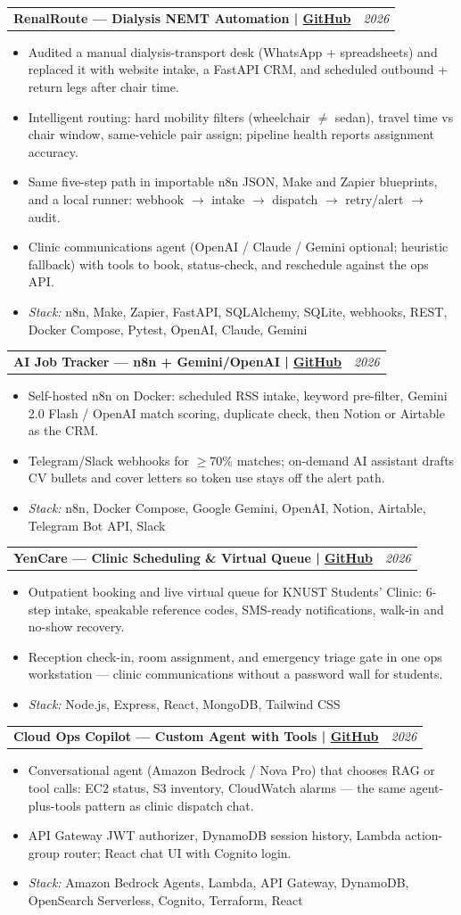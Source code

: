 \documentclass[letterpaper,11pt]{article}
\makeatletter
\newcommand{\resumeItem}[1]{\item\small{#1\vspace{-1pt}}}
\newcommand{\resumeProjectHeading}[2]{%
  \vspace{-2pt}\item
  \begin{tabular*}{1.0\textwidth}[t]{l@{\extracolsep{\fill}}r}
    \textbf{#1} & \textit{\small #2} \\
  \end{tabular*}\vspace{-7pt}
}
\newcommand{\resumeItemListStart}{\begin{itemize}[leftmargin=0.15in]}
\newcommand{\resumeItemListEnd}{\end{itemize}\vspace{-5pt}}
\makeatother
\begin{document}
  \resumeProjectHeading
    {RenalRoute --- Dialysis NEMT Automation \textnormal{|} \href{https://github.com/GeekKwame/renal-route}{\small GitHub}}{2026}
  \resumeItemListStart
    \resumeItem{Audited a manual dialysis-transport desk (WhatsApp + spreadsheets) and replaced it with website intake, a FastAPI CRM, and scheduled outbound + return legs after chair time.}
    \resumeItem{Intelligent routing: hard mobility filters (wheelchair $\neq$ sedan), travel time vs chair window, same-vehicle pair assign; pipeline health reports assignment accuracy.}
    \resumeItem{Same five-step path in importable n8n JSON, Make and Zapier blueprints, and a local runner: webhook $\rightarrow$ intake $\rightarrow$ dispatch $\rightarrow$ retry/alert $\rightarrow$ audit.}
    \resumeItem{Clinic communications agent (OpenAI / Claude / Gemini optional; heuristic fallback) with tools to book, status-check, and reschedule against the ops API.}
    \resumeItem{\textit{Stack:} n8n, Make, Zapier, FastAPI, SQLAlchemy, SQLite, webhooks, REST, Docker Compose, Pytest, OpenAI, Claude, Gemini}
  \resumeItemListEnd

  \resumeProjectHeading
    {AI Job Tracker --- n8n + Gemini/OpenAI \textnormal{|} \href{https://github.com/GeekKwame/job-tracker-n8n}{\small GitHub}}{2026}
  \resumeItemListStart
    \resumeItem{Self-hosted n8n on Docker: scheduled RSS intake, keyword pre-filter, Gemini 2.0 Flash / OpenAI match scoring, duplicate check, then Notion or Airtable as the CRM.}
    \resumeItem{Telegram/Slack webhooks for $\ge$70\% matches; on-demand AI assistant drafts CV bullets and cover letters so token use stays off the alert path.}
    \resumeItem{\textit{Stack:} n8n, Docker Compose, Google Gemini, OpenAI, Notion, Airtable, Telegram Bot API, Slack}
  \resumeItemListEnd

  \resumeProjectHeading
    {YenCare --- Clinic Scheduling \& Virtual Queue \textnormal{|} \href{https://github.com/GeekKwame/yencare-platform}{\small GitHub}}{2026}
  \resumeItemListStart
    \resumeItem{Outpatient booking and live virtual queue for KNUST Students' Clinic: 6-step intake, speakable reference codes, SMS-ready notifications, walk-in and no-show recovery.}
    \resumeItem{Reception check-in, room assignment, and emergency triage gate in one ops workstation --- clinic communications without a password wall for students.}
    \resumeItem{\textit{Stack:} Node.js, Express, React, MongoDB, Tailwind CSS}
  \resumeItemListEnd

  \resumeProjectHeading
    {Cloud Ops Copilot --- Custom Agent with Tools \textnormal{|} \href{https://github.com/GeekKwame/cloud-ops-copilot}{\small GitHub}}{2026}
  \resumeItemListStart
    \resumeItem{Conversational agent (Amazon Bedrock / Nova Pro) that chooses RAG or tool calls: EC2 status, S3 inventory, CloudWatch alarms --- the same agent-plus-tools pattern as clinic dispatch chat.}
    \resumeItem{API Gateway JWT authorizer, DynamoDB session history, Lambda action-group router; React chat UI with Cognito login.}
    \resumeItem{\textit{Stack:} Amazon Bedrock Agents, Lambda, API Gateway, DynamoDB, OpenSearch Serverless, Cognito, Terraform, React}
  \resumeItemListEnd
\end{document}
